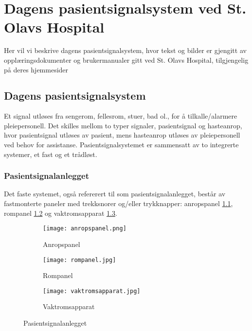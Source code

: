 \chapter{Dagens pasientsignalsystem ved St. Olavs Hospital}
\label{appendix_dagenssystem}
 
Her vil vi beskrive dagens pasientsignalsystem, hvor tekst og bilder er gjengitt av opplæringsdokumenter og brukermanualer gitt ved St. Olavs Hospital, tilgjengelig på deres hjemmesider \cite{Brukerveiledning for Pasientsignal, Brukermanual for Pasientsignal og Pasientsignalapplikasjon, Brukerveiledning for Tradlos telefon}

\section{Dagens pasientsignalsystem}
Et signal utløses fra sengerom, fellesrom, stuer, bad ol., for å tilkalle/alarmere pleiepersonell. Det skilles mellom to typer signaler, pasientsignal og hasteanrop, hvor pasientsignal utløses av pasient, mens hasteanrop utløses av pleiepersonell ved behov for assistanse. Pasientsignalsystemet er sammensatt av to integrerte systemer, et fast og et trådløst. 

\subsection{Pasientsignalanlegget}
Det faste systemet, også refererert til som pasientsignalanlegget, består av fastmonterte paneler med trekksnorer og/eller trykknapper: anropspanel \ref{anropspanel}, rompanel \ref{rompanel} og vaktromsapparat \ref{vaktromsapparat}.

\begin{figure}[H]
        \centering
        \begin{subfigure}[b]{0.3\textwidth}
        		\centering
                \texttt{[image: anropspanel.png]}
                \caption{Anropspanel}
                \label{anropspanel}
        \end{subfigure}%
        \begin{subfigure}[b]{0.3\textwidth}
        		\centering
                \texttt{[image: rompanel.jpg]}
                \caption{Rompanel}
                \label{rompanel}
        \end{subfigure}
        \begin{subfigure}[b]{0.3\textwidth}
        		\centering
                \texttt{[image: vaktromsapparat.jpg]}
                \caption{Vaktromsapparat}
                \label{vaktromsapparat}
        \end{subfigure}
        \caption{Pasientsignalanlegget}\label{pasientsignalanlegget}
\end{figure}
\noindent
